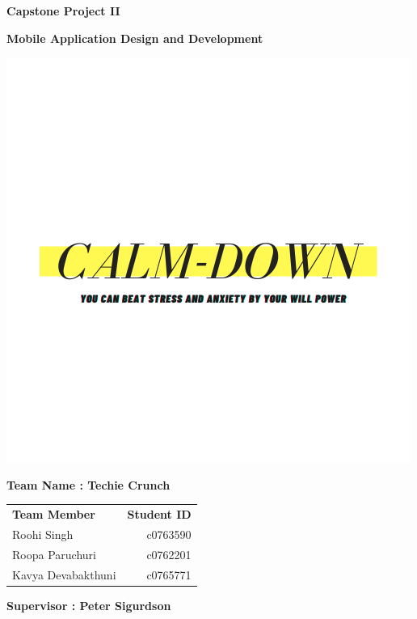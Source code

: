 \begin{center}
\textbf{Capstone Project II}
\end{center}
\begin{center}
\textbf{Mobile Application Design and Development}
\end{center}
\begin{center}
\includegraphics[scale=0.7]{CALM-DOWN Logo.png}
\end{center}



\begin{center}
\textbf{Team Name :  Techie Crunch}
\end{center}
\begin{center}
\begin{tabular}{ l r }
\textbf{Team Member} & \textbf{Student ID}\\
 Roohi Singh & c0763590\\  
 Roopa Paruchuri & c0762201\\
 Kavya Devabakthuni & c0765771
\end{tabular}
\newline
\newline

\end{center}
\begin{center}
\textbf{Supervisor : Peter Sigurdson}
\end{center}